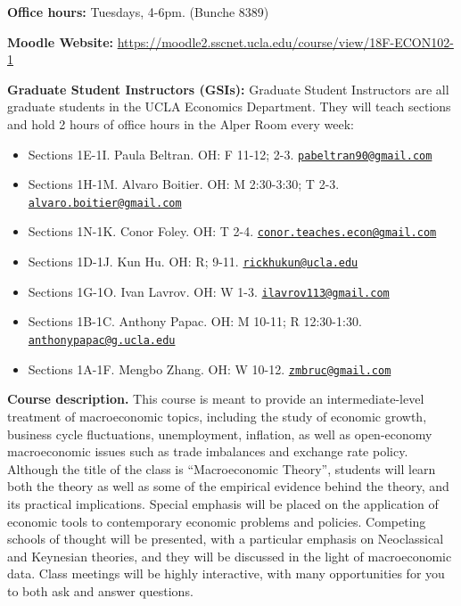 \documentclass[]{book}
\providecommand{\tightlist}{%
  \setlength{\itemsep}{0pt}\setlength{\parskip}{0pt}}
\theoremstyle{definition}
\theoremstyle{definition}
\theoremstyle{definition}
\theoremstyle{remark}
\begin{document}
\textbf{Office hours:} Tuesdays, 4-6pm. (Bunche 8389)

\textbf{Moodle Website:}
\url{https://moodle2.sscnet.ucla.edu/course/view/18F-ECON102-1}

\textbf{Graduate Student Instructors (GSIs):} Graduate Student
Instructors are all graduate students in the UCLA Economics Department.
They will teach sections and hold 2 hours of office hours in the Alper
Room every week:

\begin{itemize}
\tightlist
\item
  Sections 1E-1I. Paula Beltran. OH: F 11-12; 2-3.
  \href{mailto:pabeltran90@gmail.com}{\nolinkurl{pabeltran90@gmail.com}}
\item
  Sections 1H-1M. Alvaro Boitier. OH: M 2:30-3:30; T 2-3.
  \href{mailto:alvaro.boitier@gmail.com}{\nolinkurl{alvaro.boitier@gmail.com}}
\item
  Sections 1N-1K. Conor Foley. OH: T 2-4.
  \href{mailto:conor.teaches.econ@gmail.com}{\nolinkurl{conor.teaches.econ@gmail.com}}
\item
  Sections 1D-1J. Kun Hu. OH: R; 9-11.
  \href{mailto:rickhukun@ucla.edu}{\nolinkurl{rickhukun@ucla.edu}}
\item
  Sections 1G-1O. Ivan Lavrov. OH: W 1-3.
  \href{mailto:ilavrov113@gmail.com}{\nolinkurl{ilavrov113@gmail.com}}
\item
  Sections 1B-1C. Anthony Papac. OH: M 10-11; R 12:30-1:30.
  \href{mailto:anthonypapac@g.ucla.edu}{\nolinkurl{anthonypapac@g.ucla.edu}}
\item
  Sections 1A-1F. Mengbo Zhang. OH: W 10-12.
  \href{mailto:zmbruc@gmail.com}{\nolinkurl{zmbruc@gmail.com}}
\end{itemize}

\textbf{Course description.} This course is meant to provide an
intermediate-level treatment of macroeconomic topics, including the
study of economic growth, business cycle fluctuations, unemployment,
inflation, as well as open-economy macroeconomic issues such as trade
imbalances and exchange rate policy. Although the title of the class is
``Macroeconomic Theory'', students will learn both the theory as well as
some of the empirical evidence behind the theory, and its practical
implications. Special emphasis will be placed on the application of
economic tools to contemporary economic problems and policies. Competing
schools of thought will be presented, with a particular emphasis on
Neoclassical and Keynesian theories, and they will be discussed in the
light of macroeconomic data. Class meetings will be highly interactive,
with many opportunities for you to both ask and answer questions.
\end{document}
